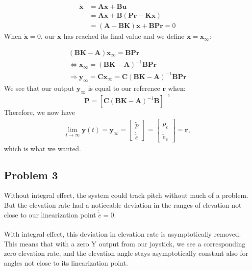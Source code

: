\begin{align*}
  \dot{\boldsymbol{x}} &= \boldsymbol{Ax} + \boldsymbol{Bu} \\
                       &= \boldsymbol{Ax} +
                         \boldsymbol{B}(\boldsymbol{Pr} -
                         \boldsymbol{Kx}) \\
                       &= (\boldsymbol{A}-\boldsymbol{BK})\boldsymbol{x}
                         + \boldsymbol{BPr} = 0
\end{align*}
When $\boldsymbol{\dot{x}} = 0$, our $\boldsymbol{x}$ has reached its
final value and we define $\boldsymbol{x} = \boldsymbol{x_\infty}$:

\begin{align*}
  (\boldsymbol{BK} - \boldsymbol{A})\boldsymbol{x_\infty} = \boldsymbol{BPr} \\
  \Leftrightarrow \boldsymbol{x_\infty} = (\boldsymbol{BK} - \boldsymbol{A})^{-1}\boldsymbol{BPr} \\
  \Rightarrow \boldsymbol{y_\infty} = \boldsymbol{Cx_\infty} = \boldsymbol{C}(\boldsymbol{BK} - \boldsymbol{A})^{-1}\boldsymbol{BPr}
\end{align*}
We see that our output $\boldsymbol{y_\infty}$ is equal to our reference $\boldsymbol{r}$ when:
\begin{equation}
  \boldsymbol{P} = [\boldsymbol{C}(\boldsymbol{BK} - \boldsymbol{A})^{-1}\boldsymbol{B}]^{-1}
\end{equation}
Therefore, we now have
\begin{align*}
\lim_{t\to\infty}\boldsymbol{y}(t) = \boldsymbol{y_\infty} =
\begin{bmatrix}
\tilde{p} \\
\dot{\tilde{e}}
\end{bmatrix}
= 
\begin{bmatrix}
\tilde{p}_c \\
\dot{\tilde{e}}_c
\end{bmatrix}
= \boldsymbol{r},
\end{align*}
which is what we wanted.
\subsection{Problem 3}
Without integral effect, the system could track pitch without much of a problem. But the elevation rate had a noticeable deviation in the ranges of elevation not close to our linearization point $\dot{\tilde{e}} = 0$. %
\\
\\
With integral effect, this deviation in elevation rate is asymptotically removed. This means that with a zero Y output from our joystick, we see a corresponding zero elevation rate, and the elevation angle stays asymptotically constant also for angles not close to its linearization point.


